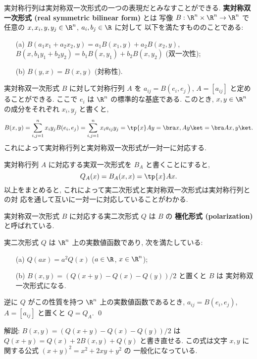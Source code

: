 \documentclass[12pt,twoside]{jarticle}
\begin{document}
実対称行列は実対称双一次形式の一つの表現だとみなすことができる.  
{\bf 実対称双一次形式 (real symmetric bilinear form)} とは
写像 $B:\R^n\times\R^n\to\R^n$ で
任意の $x,x_i,y,y_j\in\R^n$, $a_i,b_j\in\R$ に対して
以下を満たすもののことである:
\begin{itemize}
\item[(a)] $B(a_1x_1+a_2x_2,y)=a_1B(x_1,y)+a_2B(x_2,y)$, \\
  $B(x,b_1y_1+b_2y_2)=b_1B(x,y_1)+b_2B(x,y_2)$ \quad (双一次性);
\item[(b)] $B(y,x) = B(x,y)$ \quad (対称性).
\end{itemize}
実対称双一次形式 $B$ に対して対称行列 $A$ 
を $a_{ij}=B(e_i,e_j)$, $A=[a_{ij}]$ と定めることができる.
ここで $e_i$ は $\R^n$ の標準的な基底である.
このとき, $x,y\in\R^n$ の成分をそれぞれ $x_i,y_j$ と書くと,
\begin{equation*}
  B(x,y) = \sum_{i,j=1}^n x_i y_j B(e_i,e_j)
  = \sum_{i,j=1}^n x_i a_{ij} y_j
  = \tp{x}Ay
  = \bra x,Ay\ket = \bra Ax,y\ket.
\end{equation*}
これによって実対称行列と実対称双一次形式が一対一に対応する.

実対称行列 $A$ に対応する実双一次形式を $B_A$ と書くことにすると,
\begin{equation*}
  Q_A(x) = B_A(x,x) = \tp{x}Ax.
\end{equation*}
以上をまとめると, これによって実二次形式と実対称双一次形式は実対称行列との対
応を通して互いに一対一に対応していることがわかる.

実対称双一次形式 $B$ に対応する実二次形式 $Q$ は $B$ の
{\bf 極化形式 (polarization)} と呼ばれている.


\begin{question}
  実二次形式 $Q$ は $\R^n$ 上の実数値函数であり, 次を満たしている:
  \begin{itemize}
  \item[(a)] $Q(ax) = a^2 Q(x)$ \quad ($a\in\R$, $x\in\R^n$);
  \item[(b)] $B(x,y)=(Q(x+y)-Q(x)-Q(y))/2$ と置くと $B$ は
    実対称双一次形式になる.
  \end{itemize}
  逆に $Q$ がこの性質を持つ $\R^n$ 上の実数値函数であるとき,
  $a_{ij}=B(e_i,e_j)$, $A=[a_{ij}]$ と置くと $Q=Q_A$.
  \qed
\end{question}

\noindent
解説: $B(x,y)=(Q(x+y)-Q(x)-Q(y))/2$ 
は $Q(x+y) = Q(x) + 2B(x,y) + Q(y)$ と書き直せる.
この式は文字 $x,y$ に関する公式 $(x+y)^2 = x^2 + 2xy + y^2$ の
一般化になっている.
\end{document}

